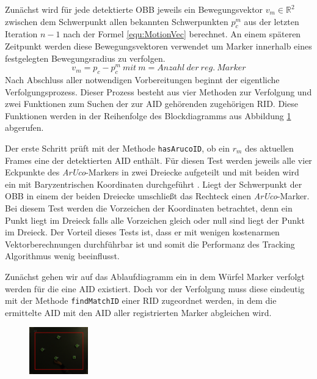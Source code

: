 Zunächst wird für jede detektierte OBB jeweils ein Bewegungsvektor $v_m \in \mathbb{R}^2$ zwischen dem Schwerpunkt allen bekannten Schwerpunkten $p_c^{m}$ aus der letzten Iteration $n-1$ nach der Formel \ref{equ:MotionVec} berechnet. An einem späteren Zeitpunkt werden diese Bewegungsvektoren verwendet um Marker innerhalb eines festgelegten Bewegungsradius zu verfolgen. 
\begin{equation}
\label{equ:MotionVec}
v_m = p_c - p_c^m \ mit \ m= Anzahl \ der \ reg. \ Marker
\end{equation}
Nach Abschluss aller notwendigen Vorbereitungen beginnt der eigentliche Verfolgungsprozess. Dieser Prozess besteht aus vier Methoden zur Verfolgung und zwei Funktionen zum Suchen der zur AID gehörenden  zugehörigen RID. Diese Funktionen werden in der Reihenfolge des Blockdiagramms aus Abbildung \ref{fig:TrackingDiagram} abgerufen. 

Der erste Schritt prüft mit der Methode \texttt{hasArucoID}, ob ein $r_m$ des aktuellen Frames eine der detektierten AID enthält. Für diesen Test werden jeweils alle vier Eckpunkte des \textit{ArUco}-Markers in zwei Dreiecke aufgeteilt und mit beiden wird ein  mit Baryzentrischen Koordinaten durchgeführt \cite{article:BaryzentriFarin}. Liegt der Schwerpunkt der OBB in einem der beiden Dreiecke umschließt das Rechteck einen \textit{ArUco}-Marker. Bei diesem Test werden die Vorzeichen der Koordinaten betrachtet, denn ein Punkt liegt im Dreieck falls alle Vorzeichen gleich oder null sind liegt der Punkt im Dreieck. Der Vorteil dieses Tests ist, dass er mit wenigen kostenarmen Vektorberechnungen durchführbar ist und somit die Performanz des Tracking Algorithmus wenig beeinflusst. 

Zunächst gehen wir auf das Ablaufdiagramm ein in dem Würfel Marker verfolgt werden für die eine AID existiert. Doch vor der Verfolgung muss diese eindeutig mit der Methode \texttt{findMatchID} einer RID zugeordnet werden, in dem die ermittelte AID mit den AID aller registrierten Marker abgleichen wird.
\begin{figure}[H]
	\centering
	\includegraphics[width=1in]{Bilder/TrackingScreenshot_x.jpg}
	\caption{}
	\label{fig:TrackingDiagram}
\end{figure}
\newpage